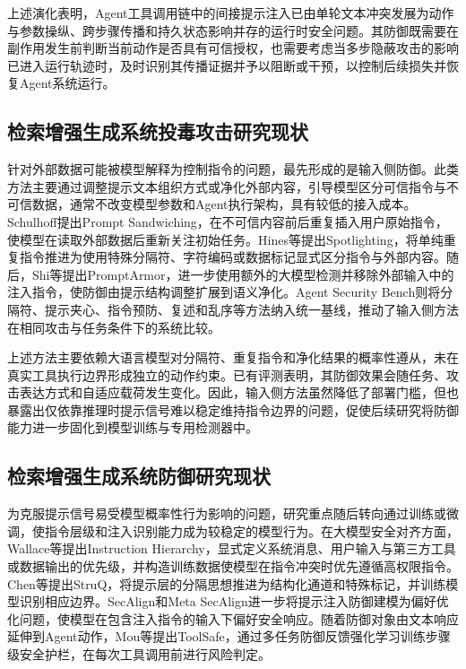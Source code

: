 
上述演化表明，Agent工具调用链中的间接提示注入已由单轮文本冲突发展为动作与参数操纵、跨步骤传播和持久状态影响并存的运行时安全问题。其防御既需要在副作用发生前判断当前动作是否具有可信授权，也需要考虑当多步隐蔽攻击的影响已进入运行轨迹时，及时识别其传播证据并予以阻断或干预，以控制后续损失并恢复Agent系统运行。

\subsection{检索增强生成系统投毒攻击研究现状}

针对外部数据可能被模型解释为控制指令的问题，最先形成的是输入侧防御。此类方法主要通过调整提示文本组织方式或净化外部内容，引导模型区分可信指令与不可信数据，通常不改变模型参数和Agent执行架构，具有较低的接入成本。Schulhoff\cite{schulhoff2024sandwich}提出Prompt Sandwiching，在不可信内容前后重复插入用户原始指令，使模型在读取外部数据后重新关注初始任务。Hines等\cite{hines2024defending}提出Spotlighting，将单纯重复指令推进为使用特殊分隔符、字符编码或数据标记显式区分指令与外部内容。随后，Shi等\cite{shi2025promptarmor}提出PromptArmor，进一步使用额外的大模型检测并移除外部输入中的注入指令，使防御由提示结构调整扩展到语义净化。Agent Security Bench\cite{zhang2025asb}则将分隔符、提示夹心、指令预防、复述和乱序等方法纳入统一基线，推动了输入侧方法在相同攻击与任务条件下的系统比较。

上述方法\cite{schulhoff2024sandwich,hines2024defending,zhang2025asb,shi2025promptarmor}主要依赖大语言模型对分隔符、重复指令和净化结果的概率性遵从，未在真实工具执行边界形成独立的动作约束。已有评测\cite{zhan2025adaptive,balunovic2024agentdojo,zhang2024injectagent}表明，其防御效果会随任务、攻击表达方式和自适应载荷发生变化。因此，输入侧方法虽然降低了部署门槛，但也暴露出仅依靠推理时提示信号难以稳定维持指令边界的问题，促使后续研究将防御能力进一步固化到模型训练与专用检测器中。

\subsection{检索增强生成系统防御研究现状}

为克服提示信号易受模型概率性行为影响的问题，研究重点随后转向通过训练或微调，使指令层级和注入识别能力成为较稳定的模型行为。在大模型安全对齐方面，Wallace等\cite{wallace2024instruction}提出Instruction Hierarchy，显式定义系统消息、用户输入与第三方工具或数据输出的优先级，并构造训练数据使模型在指令冲突时优先遵循高权限指令。Chen等\cite{chen2025struq}提出StruQ，将提示层的分隔思想推进为结构化通道和特殊标记，并训练模型识别相应边界。SecAlign\cite{chen2025secalign}和Meta SecAlign\cite{chen2025metasecalign}进一步将提示注入防御建模为偏好优化问题，使模型在包含注入指令的输入下偏好安全响应。随着防御对象由文本响应延伸到Agent动作，Mou等\cite{mou2026toolsafe}提出ToolSafe，通过多任务防御反馈强化学习训练步骤级安全护栏，在每次工具调用前进行风险判定。

